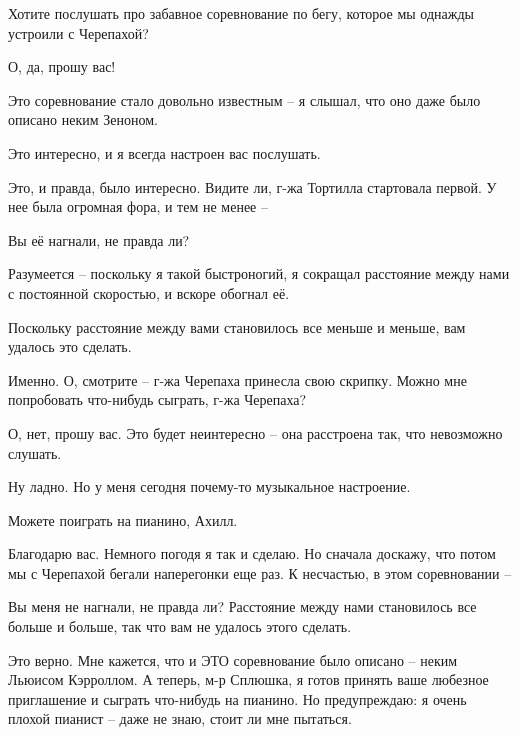 \documentclass[../main.tex]{subfiles}
\begin{document}


\begin{dialogue}

 Хотите послушать про забавное соревнование по бегу, которое мы однажды устроили с Черепахой?

 О, да, прошу вас!

 Это соревнование стало довольно известным \--- я слышал, что оно даже было описано неким Зеноном.

 Это интересно, и я всегда настроен вас послушать.

 Это, и правда, было интересно. Видите ли, г-жа Тортилла стартовала первой. У нее была огромная фора, и тем не менее \---

 Вы её нагнали, не правда ли?

 Разумеется \--- поскольку я такой быстроногий, я сокращал расстояние между нами с постоянной скоростью, и вскоре обогнал её.

 Поскольку расстояние между вами становилось все меньше и меньше, вам удалось это сделать.

 Именно. О, смотрите \--- г-жа Черепаха принесла свою скрипку. Можно мне попробовать что-нибудь сыграть, г-жа Черепаха?

 О, нет, прошу вас. Это будет неинтересно \--- она расстроена так, что невозможно слушать.

 Ну ладно. Но у меня сегодня почему-то музыкальное настроение.

 Можете поиграть на пианино, Ахилл.

 Благодарю вас. Немного погодя я так и сделаю. Но сначала доскажу, что потом мы с Черепахой бегали наперегонки еще раз. К несчастью, в этом соревновании \---

 Вы меня не нагнали, не правда ли? Расстояние между нами становилось все больше и больше, так что вам не удалось этого сделать.

 Это верно. Мне кажется, что и ЭТО соревнование было описано \--- неким Льюисом Кэрроллом. А теперь, м-р Сплюшка, я готов принять ваше любезное приглашение и сыграть что-нибудь на пианино. Но предупреждаю: я очень плохой пианист \--- даже не знаю, стоит ли мне пытаться.


\end{dialogue}
\end{document}
